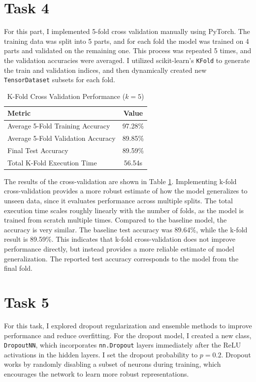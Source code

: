 \documentclass{article}
\begin{document}
\section{Task 4}

For this part, I implemented 5-fold cross validation manually using PyTorch. The training data was split into 5 parts, and for each fold the model was trained on 4 parts and validated on the remaining one. This process was repeated 5 times, and the validation accuracies were averaged. I utilized scikit-learn's \texttt{KFold} to generate the train and validation indices, and then dynamically created new \texttt{TensorDataset} subsets for each fold.

\begin{table}[h]
\centering
\caption{K-Fold Cross Validation Performance ($k=5$)}
\label{tab:kfold-performance}
\begin{tabular}{@{}lc@{}}
\toprule
\textbf{Metric} & \textbf{Value} \\ \midrule
Average 5-Fold Training Accuracy & 97.28\% \\
Average 5-Fold Validation Accuracy & 89.85\% \\
Final Test Accuracy & 89.59\% \\
Total K-Fold Execution Time & 56.54s \\ \bottomrule
\end{tabular}
\end{table}

The results of the cross-validation are shown in Table \ref{tab:kfold-performance}. Implementing k-fold cross-validation provides a more robust estimate of how the model generalizes to unseen data, since it evaluates performance across multiple splits. The total execution time scales roughly linearly with the number of folds, as the model is trained from scratch multiple times. Compared to the baseline model, the accuracy is very similar. The baseline test accuracy was 89.64\%, while the k-fold result is 89.59\%. This indicates that k-fold cross-validation does not improve performance directly, but instead provides a more reliable estimate of model generalization. The reported test accuracy corresponds to the model from the final fold.

\section{Task 5}
For this task, I explored dropout regularization and ensemble methods to improve performance and reduce overfitting. For the dropout model, I created a new class, \texttt{DropoutNN}, which incorporates \texttt{nn.Dropout} layers immediately after the ReLU activations in the hidden layers. I set the dropout probability to $p=0.2$. Dropout works by randomly disabling a subset of neurons during training, which encourages the network to learn more robust representations.
\end{document}
